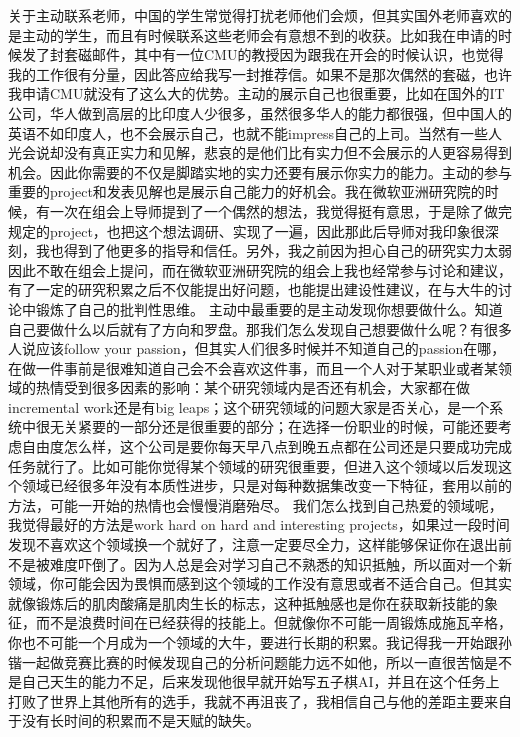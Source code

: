 \documentclass{vivid_layout}
\begin{document}
关于主动联系老师，中国的学生常觉得打扰老师他们会烦，但其实国外老师喜欢的是主动的学生，而且有时候联系这些老师会有意想不到的收获。比如我在申请的时候发了封套磁邮件，其中有一位CMU的教授因为跟我在开会的时候认识，也觉得我的工作很有分量，因此答应给我写一封推荐信。如果不是那次偶然的套磁，也许我申请CMU就没有了这么大的优势。主动的展示自己也很重要，比如在国外的IT公司，华人做到高层的比印度人少很多，虽然很多华人的能力都很强，但中国人的英语不如印度人，也不会展示自己，也就不能impress自己的上司。当然有一些人光会说却没有真正实力和见解，悲哀的是他们比有实力但不会展示的人更容易得到机会。因此你需要的不仅是脚踏实地的实力还要有展示你实力的能力。主动的参与重要的project和发表见解也是展示自己能力的好机会。我在微软亚洲研究院的时候，有一次在组会上导师提到了一个偶然的想法，我觉得挺有意思，于是除了做完规定的project，也把这个想法调研、实现了一遍，因此那此后导师对我印象很深刻，我也得到了他更多的指导和信任。另外，我之前因为担心自己的研究实力太弱因此不敢在组会上提问，而在微软亚洲研究院的组会上我也经常参与讨论和建议，有了一定的研究积累之后不仅能提出好问题，也能提出建设性建议，在与大牛的讨论中锻炼了自己的批判性思维。
主动中最重要的是主动发现你想要做什么。知道自己要做什么以后就有了方向和罗盘。那我们怎么发现自己想要做什么呢？有很多人说应该follow your passion，但其实人们很多时候并不知道自己的passion在哪，在做一件事前是很难知道自己会不会喜欢这件事，而且一个人对于某职业或者某领域的热情受到很多因素的影响：某个研究领域内是否还有机会，大家都在做incremental work还是有big leaps；这个研究领域的问题大家是否关心，是一个系统中很无关紧要的一部分还是很重要的部分；在选择一份职业的时候，可能还要考虑自由度怎么样，这个公司是要你每天早八点到晚五点都在公司还是只要成功完成任务就行了。比如可能你觉得某个领域的研究很重要，但进入这个领域以后发现这个领域已经很多年没有本质性进步，只是对每种数据集改变一下特征，套用以前的方法，可能一开始的热情也会慢慢消磨殆尽。
我们怎么找到自己热爱的领域呢，我觉得最好的方法是work hard on hard and interesting projects，如果过一段时间发现不喜欢这个领域换一个就好了，注意一定要尽全力，这样能够保证你在退出前不是被难度吓倒了。因为人总是会对学习自己不熟悉的知识抵触，所以面对一个新领域，你可能会因为畏惧而感到这个领域的工作没有意思或者不适合自己。但其实就像锻炼后的肌肉酸痛是肌肉生长的标志，这种抵触感也是你在获取新技能的象征，而不是浪费时间在已经获得的技能上。但就像你不可能一周锻炼成施瓦辛格，你也不可能一个月成为一个领域的大牛，要进行长期的积累。我记得我一开始跟孙锴一起做竞赛比赛的时候发现自己的分析问题能力远不如他，所以一直很苦恼是不是自己天生的能力不足，后来发现他很早就开始写五子棋AI，并且在这个任务上打败了世界上其他所有的选手，我就不再沮丧了，我相信自己与他的差距主要来自于没有长时间的积累而不是天赋的缺失。
\end{document}
